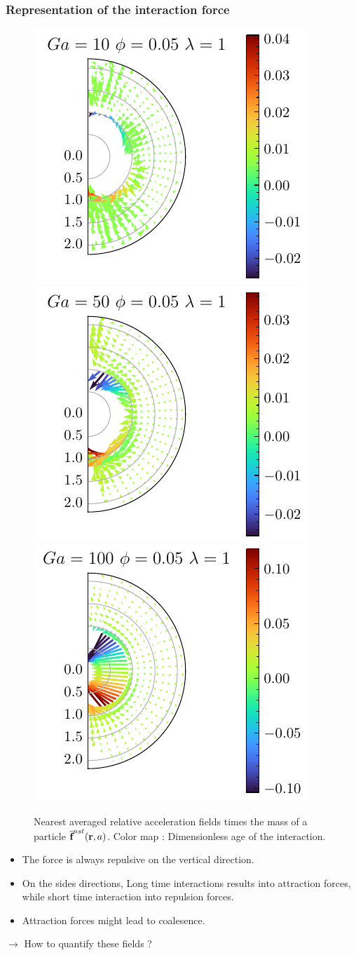 \documentclass{sintefbeamer}
\begin{document}
\begin{frame}
  \frametitle{Representation of the interaction force}

  \begin{figure}
    \includegraphics[height=0.25\textwidth]{image/HOMOGENEOUS_NEW/Dist/F_rel_l_1_Ga_10_PHI_5.pdf}
    \includegraphics[height=0.25\textwidth]{image/HOMOGENEOUS_NEW/Dist/F_rel_l_1_Ga_50_PHI_5.pdf}
    \includegraphics[height=0.25\textwidth]{image/HOMOGENEOUS_NEW/Dist/F_rel_l_1_Ga_100_PHI_5.pdf}
    
    \caption{Nearest averaged relative acceleration fields times the mass of a particle $\overline{\textbf{f}}^{nst}(\textbf{r},a)$. 
    Color map : Dimensionless age of the interaction.}
  \end{figure}

  
\begin{itemize}
  \item The force is always repulsive on the vertical direction.  
  \item On the sides  directions, Long time interactions results into attraction forces, while short time interaction into repulsion forces.
  \item Attraction forces might lead to coalesence. 
\end{itemize}

$\rightarrow$ How to quantify these fields ? 
\end{frame}
\end{document}
